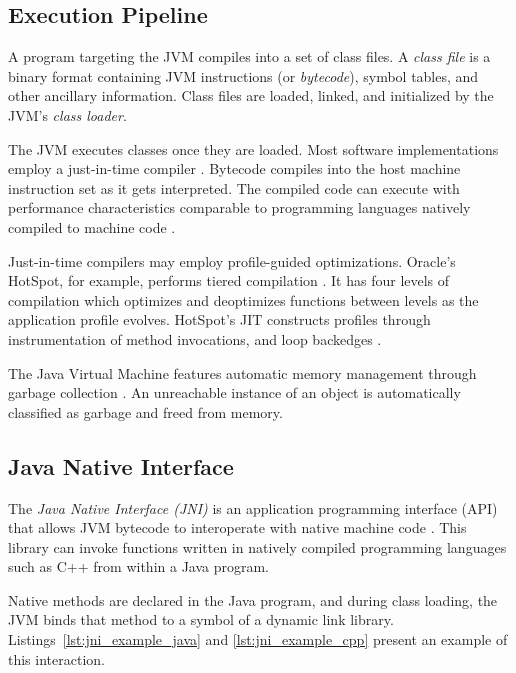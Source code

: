 \subsection{Execution Pipeline}

A program targeting the JVM compiles into a set of class files. A \textit{class file} is a binary format containing JVM instructions (or \emph{bytecode}), symbol tables, and other ancillary information. Class files are loaded, linked, and initialized by the JVM's \emph{class loader}.

The JVM executes classes once they are loaded. Most software implementations employ a just-in-time compiler \cite{kotzmann2008design}\nocite{paleczny2001java}. Bytecode compiles into the host machine instruction set as it gets interpreted. The compiled code can execute with performance characteristics comparable to programming languages natively compiled to machine code \cite{gherardi2012java,taboada2013java}.

Just-in-time compilers may employ profile-guided optimizations. Oracle's HotSpot, for example, performs tiered compilation \cite{java7tier}. It has four levels of compilation which optimizes and deoptimizes functions between levels as the application profile evolves. HotSpot's JIT constructs profiles through instrumentation of method invocations, and loop backedges \cite{openjdktier}.

The Java Virtual Machine features automatic memory management through garbage collection \cite{pufek2019gc}. An unreachable instance of an object is automatically classified as garbage and freed from memory.

\subsection{Java Native Interface}

The \emph{Java Native Interface (JNI)} is an application programming interface (API) that allows JVM bytecode to interoperate with native machine code \cite{jni}. This library can invoke functions written in natively compiled programming languages such as C++ from within a Java program.

Native methods are declared in the Java program, and during class loading, the JVM binds that method to a symbol of a dynamic link library. Listings~\ref{lst:jni_example_java} and \ref{lst:jni_example_cpp} present an example of this interaction.

